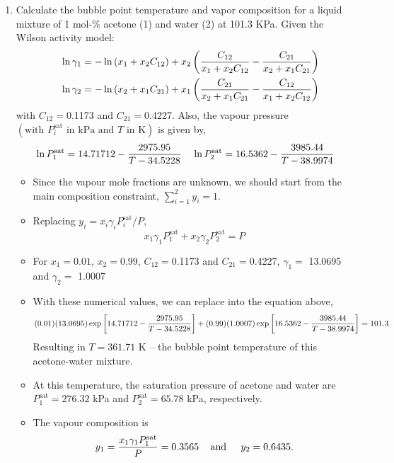 \begin{enumerate}[1)]
\clearpage
            
   \item\label{Mod05Ex04} Calculate the bubble point temperature and vapor composition for a liquid mixture of 1 mol-$\%$ acetone (1) and water (2) at 101.3 KPa. Given the Wilson activity model:
   \begin{eqnarray}
       &&\ln\gamma_{1} = -\ln\left(x_{1}+x_{2}C_{12}\right) + x_{2}\left(\displaystyle\frac{C_{12}}{x_{1}+x_{2}C_{12}}-\displaystyle\frac{C_{21}}{x_{2}+x_{1}C_{21}}\right) \nonumber \\
       &&\ln\gamma_{2} = -\ln\left(x_{2}+x_{1}C_{21}\right) + x_{1}\left(\displaystyle\frac{C_{21}}{x_{2}+x_{1}C_{21}}-\displaystyle\frac{C_{12}}{x_{1}+x_{2}C_{12}}\right) \nonumber
   \end{eqnarray}
   with $C_{12}=$0.1173 and $C_{21}=$0.4227. Also, the vapour pressure $\left(\text{with } P_{i}^{\text{sat}}\text{ in kPa and } T\text{ in K}\right)$ is given by,
\begin{displaymath}
   \ln P_{1}^{\text{sat}} = 14.71712 - \displaystyle\frac{2975.95}{T-34.5228} \;\;\;\; \ln P_{2}^{\text{sat}} = 16.5362 - \displaystyle\frac{3985.44}{T-38.9974}
\end{displaymath}


   \begin{itemize}
      \item Since the vapour mole fractions are unknown, we should start from the main composition constraint, $\sum\limits_{i=1}^{2}y_{i} = 1$.  
      \item Replacing $y_{i}=x_{i}\gamma_{i}P_{i}^{\text{sat}}/P$,
         \begin{displaymath}
            x_{1}\gamma_{1}P_{1}^{\text{sat}} + x_{2}\gamma_{2}P_{2}^{\text{sat}} = P
         \end{displaymath}
      \item For $x_{1} = 0.01$, $x_{2}=0.99$, $C_{12}=$0.1173 and $C_{21}=$0.4227, $\gamma_{1}=$ 13.0695 and $\gamma_{2}=$ 1.0007
      \item With these numerical values, we can replace into the equation above,
         \begin{displaymath}
            (0.01)(13.0695)\exp\left[14.71712 - \displaystyle\frac{2975.95}{T-34.5228}\right] + (0.99)(1.0007)\exp\left[16.5362 - \displaystyle\frac{3985.44}{T-38.9974}\right] =  101.3
         \end{displaymath}
         Resulting in  $T= 361.71$ K -- the bubble point temperature of this acetone-water mixture.
      \item At this temperature, the saturation pressure of acetone and water are $P_{1}^{\text{sat}}= 276.32$ kPa and $P_{2}^{\text{sat}} = 65.78$ kPa, respectively.
      \item The vapour composition is
         \begin{displaymath}
             y_{1} =\displaystyle\frac{x_{1}\gamma_{1}P_{1}^{\text{sat}}}{P} = 0.3565\;\;\;\text{ and }\;\;\;\; y_{2} = 0.6435.
         \end{displaymath} 
   \end{itemize}
\clearpage
            

\end{enumerate}
